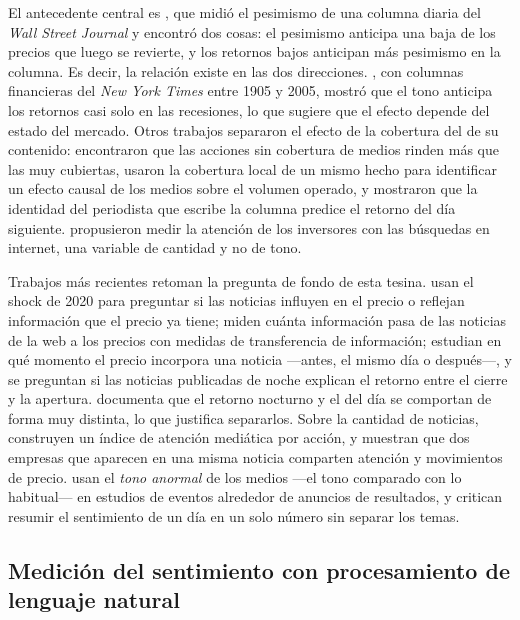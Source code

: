 El antecedente central es \citet{tetlock2007}, que midió el pesimismo de una columna diaria
del \textit{Wall Street Journal} y encontró dos cosas: el pesimismo anticipa una baja de los
precios que luego se revierte, y los retornos bajos anticipan más pesimismo en la columna. Es
decir, la relación existe en las dos direcciones. \citet{garcia2013}, con columnas
financieras del \textit{New York Times} entre 1905 y 2005, mostró que el tono anticipa los
retornos casi solo en las recesiones, lo que sugiere que el efecto depende del estado del
mercado. Otros trabajos separaron el efecto de la cobertura del de su contenido:
\citet{fang2009} encontraron que las acciones sin cobertura de medios rinden más que las muy
cubiertas, \citet{engelberg2011} usaron la cobertura local de un mismo hecho para identificar
un efecto causal de los medios sobre el volumen operado, y \citet{dougal2012} mostraron que la
identidad del periodista que escribe la columna predice el retorno del día siguiente.
\citet{da2011} propusieron medir la atención de los inversores con las búsquedas en internet,
una variable de cantidad y no de tono.

Trabajos más recientes retoman la pregunta de fondo de esta tesina. \citet{verma2026} usan el
shock de 2020 para preguntar si las noticias influyen en el precio o reflejan información que
el precio ya tiene; \citet{jazbec2020} miden cuánta información pasa de las noticias de la web
a los precios con medidas de transferencia de información; \citet{kargarzadeh2026} estudian en
qué momento el precio incorpora una noticia —antes, el mismo día o después—, y
\citet{glasserman2025} se preguntan si las noticias publicadas de noche explican el retorno
entre el cierre y la apertura. \citet{knuteson2020} documenta que el retorno nocturno y el del
día se comportan de forma muy distinta, lo que justifica separarlos. Sobre la cantidad de
noticias, \citet{cao2025hype} construyen un índice de atención mediática por acción, y
\citet{guo2017} muestran que dos empresas que aparecen en una misma noticia comparten
atención y movimientos de precio. \citet{ardia2022} usan el \textit{tono anormal} de los
medios —el tono comparado con lo habitual— en estudios de eventos alrededor de anuncios de
resultados, y \citet{chen2025topics} critican resumir el sentimiento de un día en un solo
número sin separar los temas.

\subsection{Medición del sentimiento con procesamiento de lenguaje natural}


